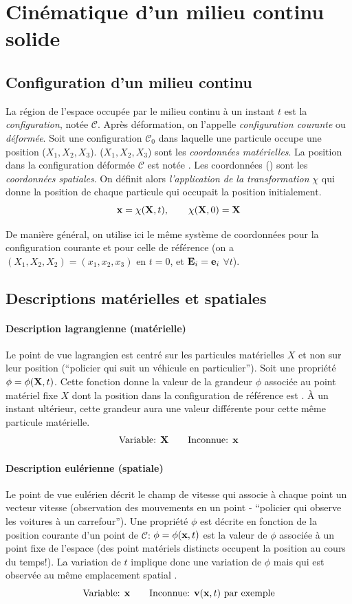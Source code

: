 \section{Cinématique d'un milieu continu solide}
\subsection{Configuration d'un milieu continu}
La région de l'espace occupée par le milieu continu à un instant $t$ est la \emph{configuration}, notée $\mathcal{C}$. Après déformation, on l'appelle \emph{configuration courante} ou \emph{déformée}. Soit une configuration $\mathcal{C}_0$ dans laquelle une particule occupe une position ($X_1, X_2, X_3$). ($X_1, X_2, X_3$) sont les \emph{coordonnées matérielles}. La position dans la configuration déformée $\mathcal{C}$ est notée . Les coordonnées () sont les \emph{coordonnées spatiales}. On définit alors \emph{l'application de la transformation} $\chi$ qui donne la position  de chaque particule qui occupait la position  initialement.
$$\textbf{x}=\chi(\textbf{X},t),\qquad \chi(\textbf{X},0)=\textbf{X}$$

De manière général, on utilise ici le même système de coordonnées pour la configuration courante et pour celle de référence (on a $(X_1, X_2, X_2)=(x_1, x_2, x_3)$ en $t=0$, et $\textbf{E}_i=\textbf{e}_i$ $\forall t$).

\subsection{Descriptions matérielles et spatiales}
\paragraph{Description lagrangienne (matérielle)}
Le point de vue lagrangien est centré sur les particules matérielles $X$ et non sur leur position (``policier qui suit un véhicule en particulier''). Soit une propriété $\phi=\phi(\textbf{X},t)$. Cette fonction donne la valeur de la grandeur $\phi$ associée au point matériel fixe $X$ dont la position dans la configuration de référence est . \`A un instant ultérieur, cette grandeur aura une valeur différente pour cette même particule matérielle.
 $$\text{Variable: } \textbf{X}\qquad \text{Inconnue: }\textbf{x}$$

 \paragraph{Description eulérienne (spatiale)}
Le point de vue eulérien décrit le champ de vitesse qui associe à chaque point un vecteur vitesse (observation des mouvements en un point - ``policier qui observe les voitures à un carrefour''). Une propriété $\phi$ est décrite en fonction de la position courante  d'un point de $\mathcal{C}$: $\phi=\phi(\textbf{x},t)$ est la valeur de $\phi$ associée à un point fixe  de l'espace (des point matériels distincts occupent la position  au cours du temps!). La variation de $t$ implique donc une variation de $\phi$ mais qui est observée au même emplacement spatial .
$$\text{Variable: }\textbf{x}\qquad\text{Inconnue: }\textbf{v}(\textbf{x},t)\text{ par exemple}$$

